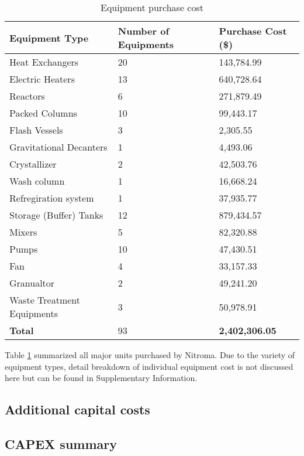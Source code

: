 \begin{table}[H]
\centering
\caption{Equipment purchase cost}
\label{tab:equipment purchase}
\begin{tabular}{lll}
\toprule
\textbf{Equipment Type}    & \textbf{Number of Equipments} & \textbf{Purchase Cost (\$)} \\\midrule
Heat Exchangers            & 20                            & 143,784.99                  \\
Electric Heaters           & 13                            & 640,728.64                  \\
Reactors                   & 6                             & 271,879.49                  \\
Packed Columns             & 10                            & 99,443.17                   \\
Flash Vessels              & 3                             & 2,305.55                    \\
Gravitational Decanters    & 1                             & 4,493.06                    \\
Crystallizer               & 2                             & 42,503.76                   \\
Wash column                & 1                             & 16,668.24                   \\
Refregiration system       & 1                             & 37,935.77                   \\
Storage (Buffer) Tanks     & 12                            & 879,434.57                  \\
Mixers                     & 5                             & 82,320.88                   \\
Pumps                      & 10                            & 47,430.51                   \\
Fan                        & 4                             & 33,157.33                   \\
Granualtor                 & 2                             & 49,241.20                   \\
Waste Treatment Equipments & 3                             & 50,978.91                   \\ \hline
\textbf{Total}             & 93                            & \textbf{2,402,306.05}       \\ \bottomrule
\end{tabular}
\end{table}

Table \ref{tab:equipment purchase} summarized all major units purchased by Nitroma. Due to the variety of equipment types, detail breakdown of individual equipment cost is not discussed here but can be found in Supplementary Information.


\subsection{Additional capital costs}


\subsection{CAPEX summary}